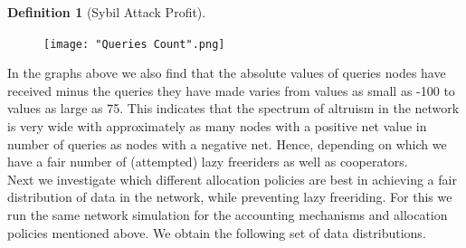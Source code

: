 \documentclass[11pt,a4paper]{article}
\theoremstyle{definition}
\newtheorem{definition}{Definition}[section]
\theoremstyle{theorem}
\theoremstyle{proposition}
\theoremstyle{corollary}
\theoremstyle{lemma}
\theoremstyle{example}
\theoremstyle{remark}
\begin{document}
\begin{definition}[Sybil Attack Profit]
\begin{figure}[H]
\begin{center}
\texttt{[image: "Queries Count".png]}
\end{center}
\end{figure}

\noindent{}In the graphs above we also find that the absolute values of queries nodes have received minus the queries they have made varies from values as small as -100 to values as large as 75. This indicates that the spectrum of altruism in the network is very wide with approximately as many nodes with a positive net value in number of queries as nodes with a negative net. Hence, depending on which we have a fair number of (attempted) lazy freeriders as well as cooperators. \vspace{1em}\\

\noindent{}Next we investigate which different allocation policies are best in achieving a fair distribution of data in the network, while preventing lazy freeriding. For this we run the same network simulation for the accounting mechanisms and allocation policies mentioned above. We obtain the following set of data distributions.


\end{definition}
\end{document}
